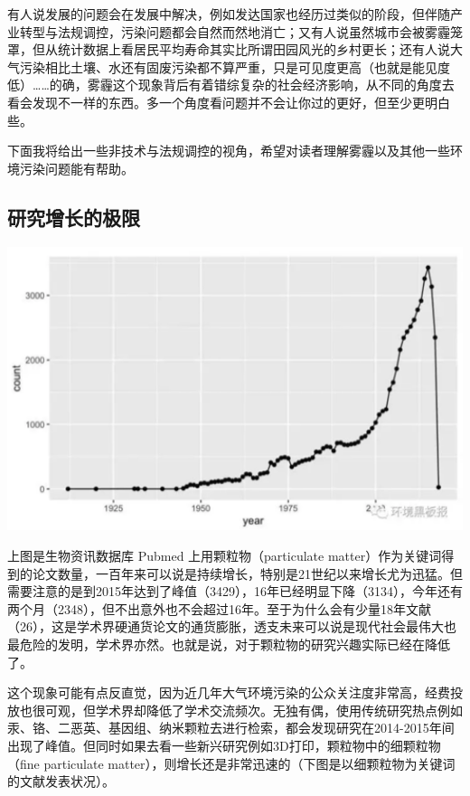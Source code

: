\documentclass[]{book}
\begin{document}
有人说发展的问题会在发展中解决，例如发达国家也经历过类似的阶段，但伴随产业转型与法规调控，污染问题都会自然而然地消亡；又有人说虽然城市会被雾霾笼罩，但从统计数据上看居民平均寿命其实比所谓田园风光的乡村更长；还有人说大气污染相比土壤、水还有固废污染都不算严重，只是可见度更高（也就是能见度低）\ldots{}\ldots{}的确，雾霾这个现象背后有着错综复杂的社会经济影响，从不同的角度去看会发现不一样的东西。多一个角度看问题并不会让你过的更好，但至少更明白些。

下面我将给出一些非技术与法规调控的视角，希望对读者理解雾霾以及其他一些环境污染问题能有帮助。

\subsection{研究增长的极限}

\includegraphics[width=6.67in]{images/cw2}

上图是生物资讯数据库 Pubmed 上用颗粒物（particulate
matter）作为关键词得到的论文数量，一百年来可以说是持续增长，特别是21世纪以来增长尤为迅猛。但需要注意的是到2015年达到了峰值（3429），16年已经明显下降（3134），今年还有两个月（2348），但不出意外也不会超过16年。至于为什么会有少量18年文献（26），这是学术界硬通货论文的通货膨胀，透支未来可以说是现代社会最伟大也最危险的发明，学术界亦然。也就是说，对于颗粒物的研究兴趣实际已经在降低了。

这个现象可能有点反直觉，因为近几年大气环境污染的公众关注度非常高，经费投放也很可观，但学术界却降低了学术交流频次。无独有偶，使用传统研究热点例如汞、铬、二恶英、基因组、纳米颗粒去进行检索，都会发现研究在2014-2015年间出现了峰值。但同时如果去看一些新兴研究例如3D打印，颗粒物中的细颗粒物（fine
particulate
matter），则增长还是非常迅速的（下图是以细颗粒物为关键词的文献发表状况）。
\end{document}
